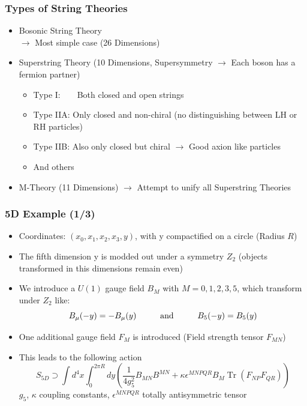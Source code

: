 \documentclass[aspectratio=1610, 9pt]{beamer}
\DeclareMathOperator{\Tr}{Tr}
\begin{document}
\begin{frame}
	\frametitle{Types of String Theories}
		\begin{itemize}
			\item Bosonic String Theory\\
			$\rightarrow$ Most simple case (26 Dimensions) 
			\item Superstring Theory (10 Dimensions, Supersymmetry $\rightarrow$ Each boson has a fermion partner)\\
			\begin{itemize}
				\item[\ ]{\color{tugreen!60!black}Type I:}\ \ \ \ Both closed and open strings
				\item[\ ]{\color{tugreen!60!black}Type IIA:} Only closed and non-chiral (no distinguishing between LH or RH particles)
				\item[\ ]{\color{tugreen!60!black}Type IIB:} Also only closed but chiral $\rightarrow$ Good axion like particles
				\item[\ ]{\color{tugreen!60!black}And others}
			\end{itemize}
			\item M-Theory (11 Dimensions)
			$\rightarrow$ Attempt to unify all Superstring Theories
		\end{itemize}
\end{frame}


\begin{frame}
	\frametitle{5D Example (1/3)}
	
	\begin{itemize}
		\item Coordinates: $(x_0, x_1, x_2, x_3, y)$, with y compactified on a circle (Radius $R$) 
		\item The fifth dimension y is modded out under a symmetry $Z_2$ (objects transformed in this dimensions remain even)
		\item We introduce a $U(1)$ gauge field $B_M$ with $M = 0,1,2,3,5$, which transform under $Z_2$ like:
		\begin{equation*}
			B_{\mu}(-y) = -B_{\mu}(y)\hspace{1 cm}\text{and}\hspace{1cm}  B_5(-y) = B_5(y)
		\end{equation*}	
		\item One additional gauge field $F_M$ is introduced (Field strength tensor $F_{MN}$)
		\item This leads to the following action
		\begin{equation*}
			S_{5D} \supset \int d^4x \int_0^{2\pi R} dy \left( \frac{1}{4 g_5^2} B_{MN} B^{MN} + \kappa \epsilon^{MNPQR} B_M \Tr(F_{NP} F_{QR}) \right)
		\end{equation*}
		$g_5$, $\kappa$ coupling constants, $\epsilon^{MNPQR}$ totally antisymmetric tensor
	\end{itemize}
\end{frame}
\end{document}

